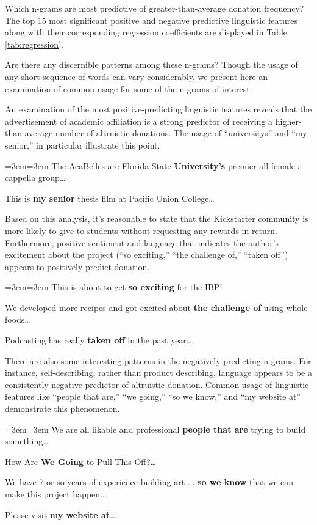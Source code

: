 \documentclass[letterpaper]{article}
\newenvironment{blockquote}{%
  \setlength{\parskip}{.5em}
  \par%
  \small
  \medskip
  \leftskip=3em\rightskip=3em%
  \noindent\ignorespaces}{%
  \par\medskip}
\begin{document}
Which n-grams are most predictive of greater-than-average donation frequency? The top 15 most significant positive and negative predictive linguistic features along with their corresponding regression coefficients are displayed in Table \ref{tab:regression}.

Are there any discernible patterns among these n-grams? Though the usage of any short sequence of words can vary considerably, we present here an examination of common usage for some of the n-grams of interest.

An examination of the most positive-predicting linguistic features reveals that the advertisement of academic affiliation is a strong predictor of receiving a higher-than-average number of altruistic donations. The usage of ``universitys'' and ``my senior,'' in particular illustrate this point.
\begin{blockquote}
The AcaBelles are Florida State \textbf{University's} premier all-female a cappella group\ldots\par\noindent
This is \textbf{my senior} thesis film at Pacific Union College\ldots\par\noindent
\end{blockquote}
Based on this analysis, it's reasonable to state that the Kickstarter community is more likely to give to students without requesting any rewards in return.
Furthermore, positive sentiment and language that indicates the author's excitement about the project (``so exciting,'' ``the challenge of,'' ``taken off'') appears to positively predict donation.
\begin{blockquote}
This is about to get \textbf{so exciting} for the IBP! \par\noindent
We developed more recipes and got excited about \textbf{the challenge of} using whole foods\ldots\par\noindent
Podcasting has really \textbf{taken off} in the past year\ldots
\end{blockquote}
There are also some interesting patterns in the negatively-predicting n-grams. For instance, self-describing, rather than product describing, language appears to be a consistently negative predictor of altruistic donation. Common usage of linguistic features like ``people that are,'' ``we going,'' ``so we know,'' and ``my website at'' demonstrate this phenomenon.
\begin{blockquote}
We are all likable and professional \textbf{people that are} trying to build something\ldots\par\noindent
How Are \textbf{We Going} to Pull This Off?\ldots\par\noindent
We have 7 or so years of experience building art ... \textbf{so we know} that we can make this project happen.\ldots\par\noindent
Please visit \textbf{my website at}\ldots
\end{blockquote}
\end{document}
